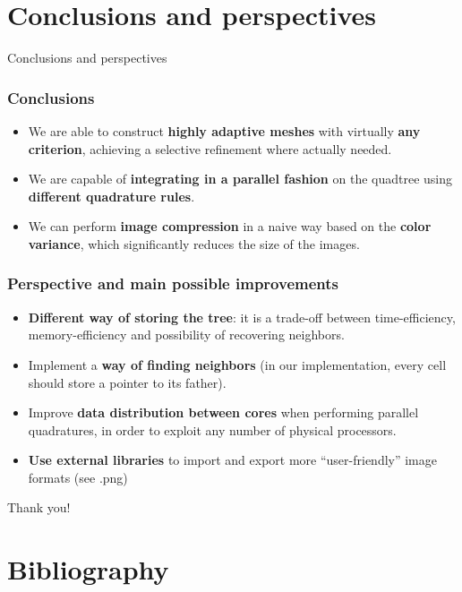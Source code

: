 \documentclass[8pt]{beamer}
\begin{document}
\section{Conclusions and perspectives}

\begin{frame}
 \begin{center}
  \begin{huge}
   Conclusions and perspectives
  \end{huge}
 \end{center}
\end{frame}

\begin{frame}
 \frametitle{Conclusions}
 \pause
 \begin{itemize}
  \item We are able to construct \textbf{highly adaptive meshes} with virtually \textbf{any criterion}, achieving a selective refinement where actually needed. \pause
  \item We are capable of \textbf{integrating in a parallel fashion} on the quadtree using \textbf{different quadrature rules}. \pause
  \item We can perform \textbf{image compression} in a naive way based on the \textbf{color variance}, which significantly reduces the size of the images.
 \end{itemize}

\end{frame}


\begin{frame}
\frametitle{Perspective and main possible improvements}
\pause
 \begin{itemize}
  \item \textbf{Different way of storing the tree}: it is a trade-off between time-efficiency, memory-efficiency and possibility of recovering neighbors. \pause
  \item Implement a \textbf{way of finding neighbors} (in our implementation, every cell should store a pointer to its father). \pause
  \item Improve \textbf{data distribution between cores} when performing parallel quadratures, in order to exploit any number of physical processors. \pause
  \item \textbf{Use external libraries} to import and export more ``user-friendly'' image formats (see .png) 
 \end{itemize}

\end{frame}

\begin{frame}
\begin{center}
 \begin{Huge}
  Thank you!
 \end{Huge}
\end{center}
\end{frame}



\section{Bibliography}
\end{document}
